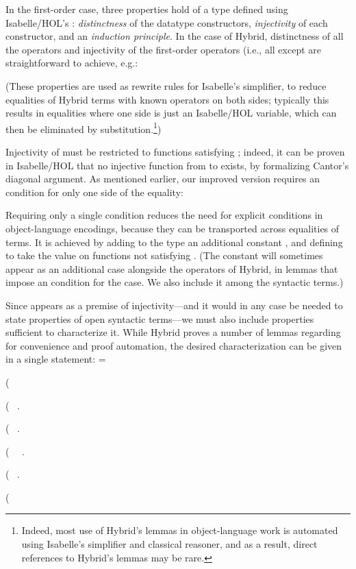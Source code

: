 \documentclass[copyright,creativecommons]{eptcs}
\begin{document}
In the first-order case, three properties hold of a type defined using
Isabelle\slash HOL's : \emph{distinctness} of the
datatype constructors, \emph{injectivity} of each constructor, and an
\emph{induction principle}.
In the case of Hybrid, distinctness of all the operators and injectivity of
the first-order operators (i.e., all except  are straightforward
to achieve, e.g.:
\begin{Display} \formal
\par\nopagebreak

\end{Display}
(These properties are used as rewrite rules for Isabelle's simplifier, to
reduce equalities of Hybrid terms with known operators on both sides; typically
this results in equalities where one side is just an Isabelle\slash HOL
variable, which can then be eliminated by substitution.\footnote{Indeed, most use of Hybrid's lemmas in object-language work is automated
    using Isabelle's simplifier and classical reasoner, and as a result,
    direct references to Hybrid's lemmas may be rare.})

Injectivity of  must be restricted to functions satisfying
; indeed, it can be proven in Isabelle\slash HOL that no
\vadjust{\pagebreak[3]}injective function from  to  exists,
by formalizing Cantor's diagonal argument.  As mentioned earlier, our
improved version requires an 
condition for only one side of the equality:
  
Requiring only a single condition
reduces the need for explicit  conditions in object-language
encodings, because they can be transported across equalities of 
terms.  It is achieved by adding to the type  an additional
constant , and defining  to take the value  on
functions not satisfying .  (The constant  will sometimes
appear as an additional case alongside the operators of Hybrid, in lemmas
that impose an  condition for the  case.  We also include
it among the syntactic terms.)

Since  appears as a premise of injectivity---and it would in any
case be needed to state properties of open syntactic terms---we must also
include properties sufficient to characterize it.  While Hybrid proves a
number of lemmas regarding  for convenience and proof automation,
the desired characterization can be given in a single statement:
{=\hbox{}
 \xdef\ajmtemp{\the\wd0}}
\begin{Display} \formal
\notationII  ( \par\nopagebreak
\notationII  ( \isaholexists\ . {} \par\nopagebreak
\notationII  ( \isaholexists\ . {} \par\nopagebreak
\notationII  ( \isaholexists\ \ . {} \par\nopagebreak
\notationII  ( \isaholexists\ . {} \par\nopagebreak
\notationII  ( 
\end{Display}
\end{document}
